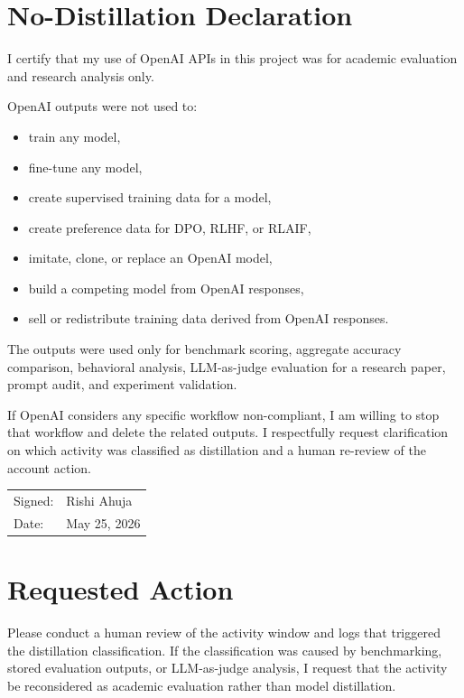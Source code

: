 \documentclass[11pt]{article}
\newcommand{\fullname}{Rishi Ahuja}
\begin{document}
\section{No-Distillation Declaration}

I certify that my use of OpenAI APIs in this project was for academic evaluation
and research analysis only.

OpenAI outputs were not used to:

\begin{itemize}
  \item train any model,
  \item fine-tune any model,
  \item create supervised training data for a model,
  \item create preference data for DPO, RLHF, or RLAIF,
  \item imitate, clone, or replace an OpenAI model,
  \item build a competing model from OpenAI responses,
  \item sell or redistribute training data derived from OpenAI responses.
\end{itemize}

The outputs were used only for benchmark scoring, aggregate accuracy comparison,
behavioral analysis, LLM-as-judge evaluation for a research paper, prompt audit,
and experiment validation.

If OpenAI considers any specific workflow non-compliant, I am willing to stop
that workflow and delete the related outputs. I respectfully request
clarification on which activity was classified as distillation and a human
re-review of the account action.

\vspace{1.5em}
\begin{tabular}{ll}
Signed: & \fullname \\
Date: & May 25, 2026 \\
\end{tabular}

\section{Requested Action}

Please conduct a human review of the activity window and logs that triggered the
distillation classification. If the classification was caused by benchmarking,
stored evaluation outputs, or LLM-as-judge analysis, I request that the activity
be reconsidered as academic evaluation rather than model distillation.
\end{document}
